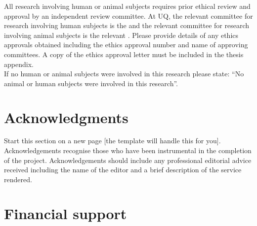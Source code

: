 \begin{instructional}
	All research involving human or animal subjects requires prior ethical review and approval by an independent review committee. At UQ, the relevant committee for research involving human subjects is the \href{http://www.uq.edu.au/research/integrity-compliance/human-ethics}{\color{blue}{Human Ethics Unit}} and the relevant committee for research involving animal subjects is the relevant \href{http://www.uq.edu.au/research/integrity-compliance/animal-welfare}{\color{blue}{Animal Ethics Committee}}.  Please provide details of any ethics approvals obtained including the ethics approval number and name of approving committees.  A copy of the ethics approval letter must be included in the thesis appendix.\\
    
    \noindent
	If no human or animal subjects were involved in this research please state: ``No animal or human subjects were involved in this research''.
\end{instructional}





\clearpage
\section*{Acknowledgments}

\begin{instructional}
    Start this section on a new page [the template will handle this for you].\\
    
    \noindent
    Acknowledgements recognise those who have been instrumental in the completion of the project.  Acknowledgements should include any professional editorial advice received including the name of the editor and a brief description of the service rendered.
\end{instructional}





\clearpage
\section*{Financial support}

